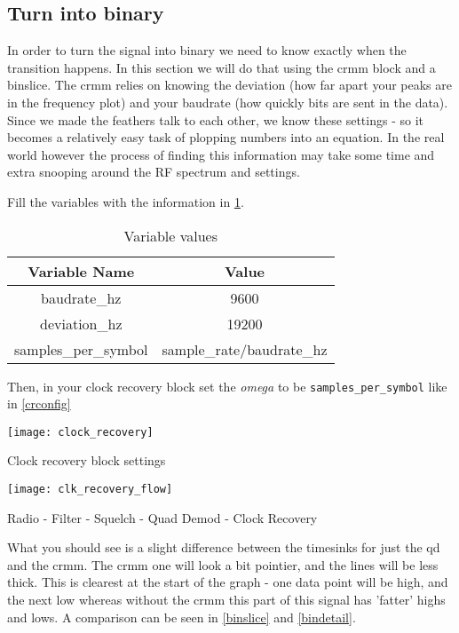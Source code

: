 \subsection{Turn into binary}

In order to turn the signal into binary we need to know exactly when the transition happens. In this section we will do that using the \Gls{crmm} block and a \Gls{binslice}. The \gls{crmm} relies on knowing the \gls{deviation} (how far apart your peaks are in the frequency plot) and your \gls{baudrate} (how quickly bits are sent in the data). Since we made the feathers talk to each other, we know these settings - so it becomes a relatively easy task of plopping numbers into an equation. In the real world however the process of finding this information may take some time and extra snooping around the \gls{RF} spectrum and settings. 


Fill the variables with the information in \cref{variablevalues}.

\begin{table}[H]
\begin{tabular}{|c|c|}
\hline
Variable Name & Value \\ \hline
baudrate\_hz & 9600 \\ \hline
deviation\_hz & 19200 \\ \hline
samples\_per\_symbol & sample\_rate/baudrate\_hz \\ \hline
\end{tabular}
\caption{Variable values}
\label{variablevalues}
\end{table}


Then, in your clock recovery block set the \textit{omega} to be \verb|samples_per_symbol| like in \cref{crconfig}

\centrefigurestart
\texttt{[image: clock\_recovery]}
\caption{Clock recovery block settings}
\label{crconfig}
\centrefigureend


\centrefigurestart
\texttt{[image: clk\_recovery\_flow]}
\caption{Radio - Filter - Squelch - Quad Demod - Clock Recovery}
\centrefigureend

What you should see is a slight difference between the \gls{timesink}s for just the \gls{qd} and the \gls{crmm}. The \gls{crmm} one will look a bit pointier, and the lines will be less thick. This is clearest at the start of the graph - one data point will be high, and the next low whereas without the \gls{crmm} this part of this signal has 'fatter' highs and lows. A comparison can be seen in \cref{binslice} and \cref{bindetail}.

